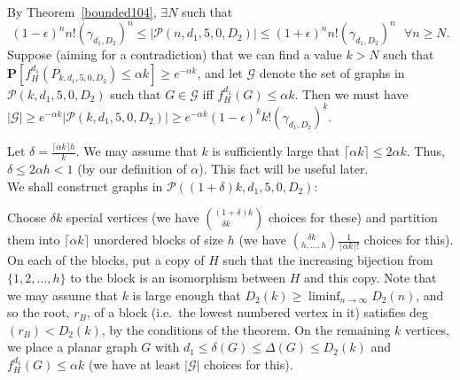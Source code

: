 \documentclass{article}
\newtheorem{Proof of Theorem}{Proof of Theorem}
\begin{document}
By Theorem~\ref{bounded104},
$\exists N$ such that
\begin{equation} \label{eq:gr}
(1-\epsilon)^{n}n! \left( \gamma_{d_{1},D_{2}} \right)^{n}
\leq |\mathcal{P}(n,d_{1},5,0,D_{2})|
\leq (1+\epsilon)^{n}n! \left( \gamma_{d_{1},D_{2}} \right)^{n} 
\textrm{ } \forall n \geq N.
\end{equation}
Suppose (aiming for a contradiction) 
that we can find a value
$k>N$ such that
$\mathbf{P} [ f_{H}^{d_{1}} (P_{k,d_{1},5,0,D_{2}}) \leq \alpha k ] \geq e^{-\alpha k}$,
and let $\mathcal{G}$ denote the set of graphs in $\mathcal{P}(k,d_{1},5,0,D_{2})$ such that
$G \in \mathcal{G}$ iff $f_{H}^{d_{1}} (G) \leq \alpha k$.
Then we must have 
$|\mathcal{G}| \geq e^{-\alpha k} |\mathcal{P}(k,d_{1},5,0,D_{2})| \geq 
e^{-\alpha k} (1-\epsilon)^{k}k! \left( \gamma_{d_{1},D_{2}} \right)^{k}$. 

Let $\delta = \frac{\lceil \alpha k \rceil h}{k}$.
We may assume that $k$ is sufficiently large that 
$\lceil \alpha k \rceil \leq 2 \alpha k$.
Thus, $\delta \leq 2 \alpha h < 1$ \label{delta}
(by our definition of $\alpha$).
This fact will be useful later. \\

We shall construct graphs in $\mathcal{P}((1+\delta)k,d_{1},5,0,D_{2})$:

Choose $\delta k$ special vertices 
(we have $\left(^{(1+\delta)k} _{\phantom{qq} \delta k} \right)$ choices for these)
and partition them into $\lceil \alpha k \rceil$ unordered blocks of size $h$
(we have $\left(^{\phantom{w} \delta k} _{h, \ldots, h} \right) \frac{1}{\lceil \alpha k \rceil !}$ choices for this).
On each of the blocks,
put a copy of $H$ such that the increasing bijection from $\{ 1,2, \ldots, h \}$ to the block
is an isomorphism between $H$ and this copy.
Note that we may assume that $k$ is large enough that $D_{2}(k) \geq \liminf_{n \to \infty}D_{2}(n)$,
and so the root, $r_{B}$, of a block
(i.e.~the lowest numbered vertex in it)
satisfies deg$(r_{B})<D_{2}(k)$,
by the conditions of the theorem. 
On the remaining $k$ vertices,
we place a planar graph $G$ with 
$d_{1} \leq \delta(G) \leq \Delta(G) \leq D_{2}(k)$
and $f_{H}^{d_{1}}(G) \leq \alpha k$
(we have at least $|\mathcal{G}|$ choices for this).
\end{document}
